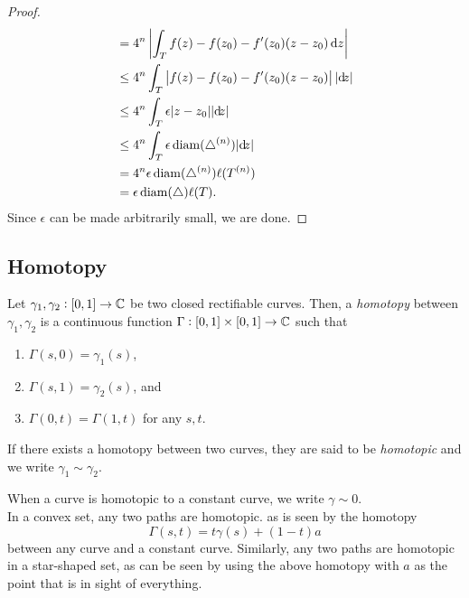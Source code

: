 \begin{proof}
\begin{align*}
					&= 4^n \left| \int_T f(z) - f(z_0) - f'(z_0) (z-z_0) \dif z \right| \\
					&\le 4^n \int_T \left| f(z) - f(z_0) - f'(z_0) (z-z_0) \right| |{\dif} z| \\
					&\le 4^n \int_T \epsilon |z-z_0| |{\dif} z| \\
					&\le 4^n \int_T \epsilon \diam(\triangle^{(n)}) |{\dif} z| \\
					&= 4^n \epsilon \diam(\triangle^{(n)}) \ell(T^{(n)}) \\
					&= \epsilon \diam(\triangle) \ell(T).
			\end{align*} 
			Since $\epsilon$ can be made arbitrarily small, we are done.
		\end{proof}

	\subsection{Homotopy}

		\begin{fdef}
			Let $\gamma_1,\gamma_2:[0,1] \to \mathbb{C}$ be two closed rectifiable curves. Then, a \emph{homotopy} between $\gamma_1,\gamma_2$ is a continuous function $\Gamma:[0,1]\times[0,1] \to \mathbb{C}$ such that
			\begin{enumerate}
				\item $\Gamma(s,0) = \gamma_1(s)$,
				\item $\Gamma(s,1) = \gamma_2(s)$, and
				\item $\Gamma(0,t) = \Gamma(1,t)$ for any $s,t$.
			\end{enumerate}
			If there exists a homotopy between two curves, they are said to be \emph{homotopic} and we write $\gamma_1 \sim \gamma_2$.
		\end{fdef}

		When a curve is homotopic to a constant curve, we write $\gamma \sim 0$.\\

		In a convex set, any two paths are homotopic. as is seen by the homotopy
		\[ \Gamma(s,t) = t\gamma(s) + (1-t)a \]
		between any curve and a constant curve. Similarly, any two paths are homotopic in a star-shaped set, as can be seen by using the above homotopy with $a$ as the point that is in sight of everything.


